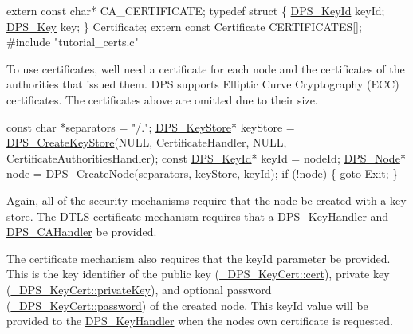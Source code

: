\begin{DoxyCodeInclude}
\textcolor{keyword}{extern} \textcolor{keyword}{const} \textcolor{keywordtype}{char}* CA\_CERTIFICATE;
\textcolor{keyword}{typedef} \textcolor{keyword}{struct }\{
    \hyperlink{struct___d_p_s___key_id}{DPS\_KeyId} keyId;
    \hyperlink{struct___d_p_s___key}{DPS\_Key} key;
\} Certificate;
\textcolor{keyword}{extern} \textcolor{keyword}{const} Certificate CERTIFICATES[];
\textcolor{preprocessor}{#include "tutorial\_certs.c"}
\end{DoxyCodeInclude}
To use certificates, we\textquotesingle{}ll need a certificate for each node and the certificates of the authorities that issued them. D\+PS supports Elliptic Curve Cryptography (E\+CC) certificates. The certificates above are omitted due to their size.


\begin{DoxyCodeInclude}
    \textcolor{keyword}{const} \textcolor{keywordtype}{char} *separators = \textcolor{stringliteral}{"/."};
    \hyperlink{group__keystore_gaf3833cfe48f848f698514bc5daa075fa}{DPS\_KeyStore}* keyStore = \hyperlink{group__keystore_gafa79de23848ff56d0cced67897313369}{DPS\_CreateKeyStore}(NULL, CertificateHandler,
                                                NULL, CertificateAuthoritiesHandler);
    \textcolor{keyword}{const} \hyperlink{struct___d_p_s___key_id}{DPS\_KeyId}* keyId = nodeId;
    \hyperlink{group__node_ga4dd612ab965134321bb57fdb065f121c}{DPS\_Node}* node = \hyperlink{group__node_gaf6641b5bbf27b2c45ac7f926b0ce4efe}{DPS\_CreateNode}(separators, keyStore, keyId);
    \textcolor{keywordflow}{if} (!node) \{
        \textcolor{keywordflow}{goto} Exit;
    \}
\end{DoxyCodeInclude}
Again, all of the security mechanisms require that the node be created with a key store. The D\+T\+LS certificate mechanism requires that a \hyperlink{group__keystore_gaccf7e3d43bc1e586132d7f1ae03d02f7}{D\+P\+S\+\_\+\+Key\+Handler} and \hyperlink{group__keystore_ga0acd005f34bca4fcbe1c460e2305ddae}{D\+P\+S\+\_\+\+C\+A\+Handler} be provided.

The certificate mechanism also requires that the {\ttfamily key\+Id} parameter be provided. This is the key identifier of the public key (\hyperlink{struct___d_p_s___key_cert_a2783654ef73f2cc58911f40cd6e4f6ba}{\+\_\+\+D\+P\+S\+\_\+\+Key\+Cert\+::cert}), private key (\hyperlink{struct___d_p_s___key_cert_a0ba1842f3982c930ba76469349b0812d}{\+\_\+\+D\+P\+S\+\_\+\+Key\+Cert\+::private\+Key}), and optional password (\hyperlink{struct___d_p_s___key_cert_a18f3f492b66fbeb3de6a09aff54369cf}{\+\_\+\+D\+P\+S\+\_\+\+Key\+Cert\+::password}) of the created node. This {\ttfamily key\+Id} value will be provided to the \hyperlink{group__keystore_gaccf7e3d43bc1e586132d7f1ae03d02f7}{D\+P\+S\+\_\+\+Key\+Handler} when the node\textquotesingle{}s own certificate is requested.


